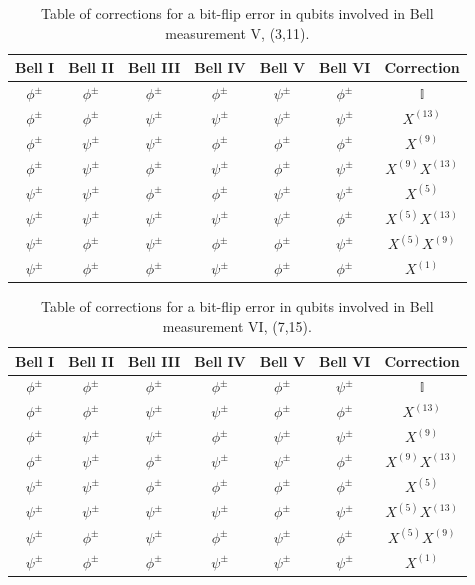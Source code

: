 \documentclass[10pt,a4paper]{book}
\numberwithin{equation}{chapter}
\numberwithin{figure}{chapter}
\numberwithin{table}{chapter}
\begin{document}
\begin{appendices}
\begin{table}[H]
    \centering
    \begin{tabular}{|c c c c c c|c|}
    \hline
   Bell I & Bell II & Bell III & Bell IV & Bell V & Bell VI & Correction \\
    \hline
  $\phi^{\pm}$&$\phi^{\pm}$&$\phi^{\pm}$&$\phi^{\pm}$&$\psi^{\pm}$&$\phi^{\pm}$&$\mathbb{I}$\\
 $\phi^{\pm}$&$\phi^{\pm}$&$\psi^{\pm}$&$\psi^{\pm}$&$\psi^{\pm}$&$\psi^{\pm}$&$X^{(13)}$\\
 $\phi^{\pm}$&$\psi^{\pm}$&$\psi^{\pm}$&$\phi^{\pm}$&$\phi^{\pm}$&$\phi^{\pm}$&$X^{(9)}$\\
 $\phi^{\pm}$&$\psi^{\pm}$&$\phi^{\pm}$&$\psi^{\pm}$&$\phi^{\pm}$&$\psi^{\pm}$&$X^{(9)}X^{(13)}$\\
 $\psi^{\pm}$&$\psi^{\pm}$&$\phi^{\pm}$&$\phi^{\pm}$&$\psi^{\pm}$&$\psi^{\pm}$&$X^{(5)}$\\
 $\psi^{\pm}$&$\psi^{\pm}$&$\psi^{\pm}$&$\psi^{\pm}$&$\psi^{\pm}$&$\phi^{\pm}$&$X^{(5)}X^{(13)}$\\
 $\psi^{\pm}$&$\phi^{\pm}$&$\psi^{\pm}$&$\phi^{\pm}$&$\phi^{\pm}$&$\psi^{\pm}$&$X^{(5)}X^{(9)}$\\
 $\psi^{\pm}$&$\phi^{\pm}$&$\phi^{\pm}$&$\psi^{\pm}$&$\phi^{\pm}$&$\phi^{\pm}$&$X^{(1)}$\\
   \hline
    \end{tabular}
	\caption{\footnotesize Table of corrections for a bit-flip error in qubits involved in Bell measurement V, (3,11).}
	\label{tab:GHZ4errorV}
\end{table}

\begin{table}[H]
    \centering
    \begin{tabular}{|c c c c c c|c|}
    \hline
   Bell I & Bell II & Bell III & Bell IV & Bell V & Bell VI & Correction \\
    \hline
  $\phi^{\pm}$&$\phi^{\pm}$&$\phi^{\pm}$&$\phi^{\pm}$&$\phi^{\pm}$&$\psi^{\pm}$&$\mathbb{I}$\\
 $\phi^{\pm}$&$\phi^{\pm}$&$\psi^{\pm}$&$\psi^{\pm}$&$\phi^{\pm}$&$\phi^{\pm}$&$X^{(13)}$\\
 $\phi^{\pm}$&$\psi^{\pm}$&$\psi^{\pm}$&$\phi^{\pm}$&$\psi^{\pm}$&$\psi^{\pm}$&$X^{(9)}$\\
 $\phi^{\pm}$&$\psi^{\pm}$&$\phi^{\pm}$&$\psi^{\pm}$&$\psi^{\pm}$&$\phi^{\pm}$&$X^{(9)}X^{(13)}$\\
 $\psi^{\pm}$&$\psi^{\pm}$&$\phi^{\pm}$&$\phi^{\pm}$&$\phi^{\pm}$&$\phi^{\pm}$&$X^{(5)}$\\
 $\psi^{\pm}$&$\psi^{\pm}$&$\psi^{\pm}$&$\psi^{\pm}$&$\phi^{\pm}$&$\psi^{\pm}$&$X^{(5)}X^{(13)}$\\
 $\psi^{\pm}$&$\phi^{\pm}$&$\psi^{\pm}$&$\phi^{\pm}$&$\psi^{\pm}$&$\phi^{\pm}$&$X^{(5)}X^{(9)}$\\
 $\psi^{\pm}$&$\phi^{\pm}$&$\phi^{\pm}$&$\psi^{\pm}$&$\psi^{\pm}$&$\psi^{\pm}$&$X^{(1)}$\\
   \hline
    \end{tabular}
	\caption{\footnotesize Table of corrections for a bit-flip error in qubits involved in Bell measurement VI, (7,15).}
	\label{tab:GHZ4errorVI}
\end{table}


\end{appendices}
\end{document}
